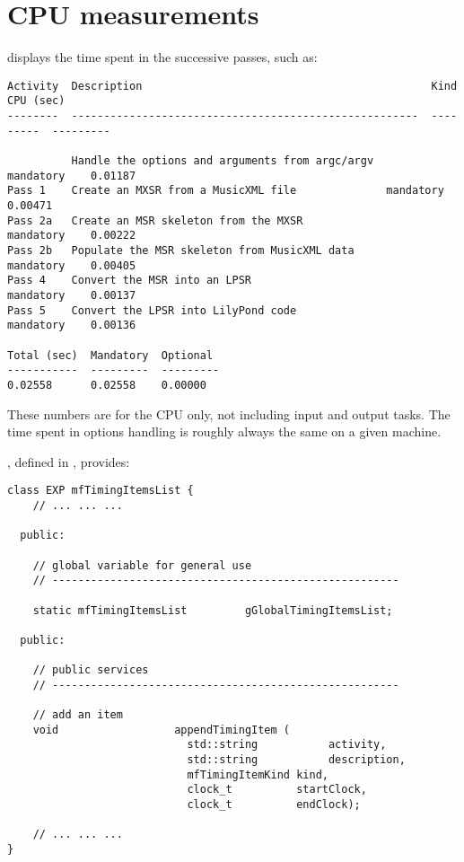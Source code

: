 
\chapter{CPU measurements}

 displays the time spent in the successive passes, such as:
\begin{lstlisting}[language=Terminal]
Activity  Description                                             Kind       CPU (sec)
--------  ------------------------------------------------------  ---------  ---------

          Handle the options and arguments from argc/argv         mandatory    0.01187
Pass 1    Create an MXSR from a MusicXML file              mandatory    0.00471
Pass 2a   Create an MSR skeleton from the MXSR                mandatory    0.00222
Pass 2b   Populate the MSR skeleton from MusicXML data            mandatory    0.00405
Pass 4    Convert the MSR into an LPSR                            mandatory    0.00137
Pass 5    Convert the LPSR into LilyPond code                 mandatory    0.00136

Total (sec)  Mandatory  Optional
-----------  ---------  ---------
0.02558      0.02558    0.00000
\end{lstlisting}

These numbers are for the CPU only, not including input and output tasks.
The time spent in options handling is roughly always the same on a given machine.

, defined in , provides:
\begin{lstlisting}[language=CPlusPlus]
class EXP mfTimingItemsList {
	// ... ... ...

  public:

    // global variable for general use
    // ------------------------------------------------------

    static mfTimingItemsList         gGlobalTimingItemsList;

  public:

    // public services
    // ------------------------------------------------------

    // add an item
    void                  appendTimingItem (
                            std::string           activity,
                            std::string           description,
                            mfTimingItemKind kind,
                            clock_t          startClock,
                            clock_t          endClock);

	// ... ... ...
}
\end{lstlisting}

